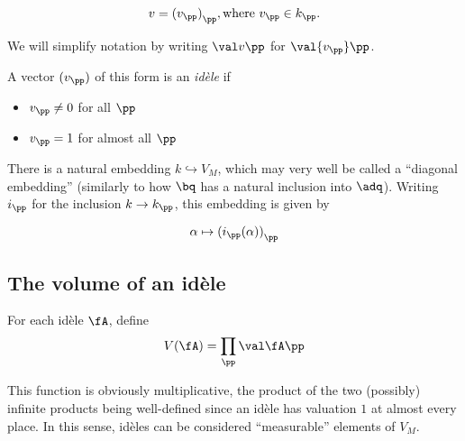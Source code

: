 \[ v={ (v_\pp) }_\pp, \text{where } v_\pp \in k_\pp. \]

We will simplify notation by writing $\val v\pp$ for $\val{v_\pp}\pp$.

\begin{defn}
  A vector $(v_\pp)$ of this form is an \textit{id\`ele} if
  \begin{itemize}
  \item $v_\pp\neq 0$ for all $\pp$
  \item $v_\pp = 1$ for almost all $\pp$
  \end{itemize}
\end{defn}

There is a natural embedding $k\hookrightarrow V_M$, which may very well be
called a ``diagonal embedding'' (similarly to how $\bq$ has a natural inclusion
into $\adq$). Writing $i_\pp$ for the inclusion $k\to k_\pp$, this embedding
is given by

\[\alpha\mapsto{ (i_\pp(\alpha)) }_\pp\]

\subsection{The volume of an id\`ele}
\label{sec:orgheadline12}

For each id\`ele $\fA$, define
\[V(\fA) = \prod_\pp \val\fA\pp \]

This function is obviously multiplicative, the product of the two (possibly) infinite
products being well-defined since an id\`ele has valuation $1$ at almost every
place. In this sense, id\`eles can be considered ``measurable'' elements of $V_M$.

